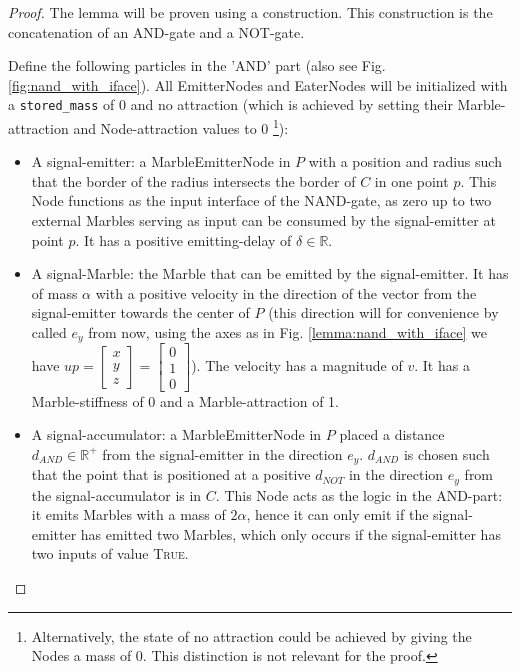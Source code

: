 \begin{proof}
    The lemma will be proven using a construction. This construction is the concatenation of an AND-gate and a NOT-gate.
    
    Define the following particles in the 'AND' part (also see Fig. \ref{fig:nand_with_iface}). All EmitterNodes and EaterNodes will be initialized with a \texttt{stored\_mass} of 0 and no attraction (which is achieved by setting their Marble-attraction and Node-attraction values to 0 \footnote{Alternatively, the state of no attraction could be achieved by giving the Nodes a mass of 0. This distinction is not relevant for the proof.}):
    \begin{itemize}
        \item A signal-emitter: a MarbleEmitterNode in $P$ with a position and radius such that the border of the radius intersects the border of $C$ in one point $p$. This Node functions as the input interface of the NAND-gate, as zero up to two external Marbles serving as input can be consumed by the signal-emitter at point $p$. It has a positive emitting-delay of $\delta \in \mathbb{R}$.
        
        \item A signal-Marble: the Marble that can be emitted by the signal-emitter. It has of mass $\alpha$ with a positive velocity in the direction of the vector from the signal-emitter towards the center of $P$ (this direction will for convenience by called $e_y$ from now, using the axes as in Fig. \ref{lemma:nand_with_iface} we have $up = \begin{bmatrix}x\\ y\\ z\end{bmatrix} = \begin{bmatrix}0\\ 1\\ 0\end{bmatrix}$). The velocity has a magnitude of $v$. It has a Marble-stiffness of 0 and a Marble-attraction of 1.
        
        \item A signal-accumulator: a MarbleEmitterNode in $P$ placed a distance $d_{AND} \in \mathbb{R}^{+}$ from the signal-emitter in the direction $e_y$. $d_{AND}$ is chosen such that the point that is positioned at a positive $d_{NOT}$ in the direction $e_y$ from the signal-accumulator is in $C$. This Node acts as the logic in the AND-part: it emits Marbles with a mass of $2\alpha$, hence it can only emit if the signal-emitter has emitted two Marbles, which only occurs if the signal-emitter has two inputs of value \textsc{True}.
        

\end{itemize}
\end{proof}
